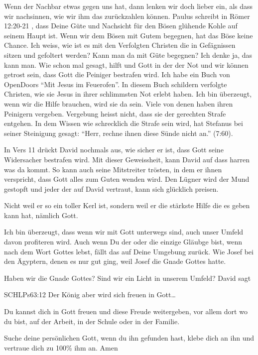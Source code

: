 \documentclass[14pt]{../../inc/mybib}
\begin{document}
    \begin{block}
    Wenn der Nachbar etwas gegen uns hat, dann lenken wir doch lieber ein, als dass wir nachsinnen, wie wir ihm das zurückzahlen können. Paulus schreibt in Römer 12:20-21 , dass Deine Güte und Nachsicht für den Bösen glühende Kohle auf seinem Haupt ist. Wenn wir dem Bösen mit Gutem begegnen, hat das Böse keine Chance. Ich weiss, wie ist es mit den Verfolgten Christen die in Gefägnissen sitzen und gefoltert werden? Kann man da mit Güte begegnen? Ich denke ja, das kann man. Wie schon mal gesagt, hilft und Gott in der der Not und wir können getrost sein, dass Gott die Peiniger bestrafen wird. Ich habe ein Buch von OpenDoors \enquote{Mit Jesus im Feuerofen}. In diesem Buch schildern verfolgte Christen, wie sie Jesus in ihrer schlimmsten Not erlebt haben. Ich bin überzeugt, wenn wir die Hilfe brauchen, wird sie da sein. Viele von denen haben ihren Peinigern vergeben. Vergebung heisst nicht, dass sie der gerechten Strafe entgehen. In dem Wissen wie schrecklich die Strafe sein wird, hat Stefanus bei seiner Steinigung gesagt: \enquote{Herr, rechne ihnen diese Sünde nicht an.} (7:60).
\end{block}
\begin{block}
    In Vers 11 drückt David nochmals aus, wie sicher er ist, dass Gott seine Widersacher bestrafen wird. Mit dieser Geweissheit, kann David auf dass harren was da kommt. So kann auch seine Mitstreiter trösten, in dem er ihnen verspricht, dass Gott alles zum Guten wenden wird. Den Lügner wird der Mund gestopft und jeder der auf David vertraut, kann sich glücklich preisen.

    Nicht weil er so ein toller Kerl ist, sondern weil er die stärkste Hilfe die es geben kann hat, nämlich Gott. 
\end{block}
\begin{block}
        Ich bin überzeugt, dass wenn wir mit Gott unterwegs sind, auch unser Umfeld davon profiteren wird. Auch wenn Du der oder die einzige Gläubge bist, wenn nach dem Wort Gottes lebst, fällt das auf Deine Umgebung zurück. Wie Josef bei den Ägyptern, denen es nur gut ging, weil Josef die Gnade Gottes hatte.

        Haben wir die Gnade Gottes? Sind wir ein Licht in unserem Umfeld? David sagt
        \begin{bibelbox}{SCHL}{Ps}{63:12}
          Der König aber wird sich freuen in Gott\dots
        \end{bibelbox}
        Du kannst dich in Gott freuen und diese Freude weitergeben, vor allem dort wo du bist, auf der Arbeit, in der Schule oder in der Familie.
\end{block}
\begin{block}
    Suche deine persönlichen Gott, wenn du ihn gefunden hast, klebe dich an ihn und vertraue dich zu 100\% ihm an.
    Amen
    \beten
\end{block}
    

   
\end{document}
